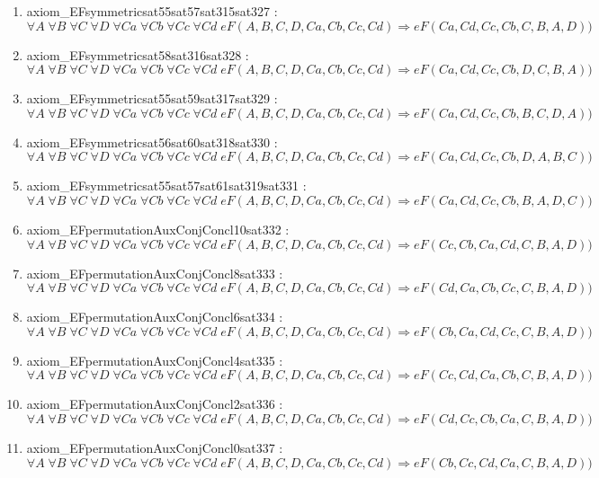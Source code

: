 \documentclass{article}
\begin{document}
\begin{enumerate}
\item axiom\_EFsymmetricsat55sat57sat315sat327 : $\forall A\;\forall B\;\forall C\;\forall D\;\forall Ca\;\forall Cb\;\forall Cc\;\forall Cd\;eF(A, B, C, D, Ca, Cb, Cc, Cd) \Rightarrow eF(Ca, Cd, Cc, Cb, C, B, A, D))$
\item axiom\_EFsymmetricsat58sat316sat328 : $\forall A\;\forall B\;\forall C\;\forall D\;\forall Ca\;\forall Cb\;\forall Cc\;\forall Cd\;eF(A, B, C, D, Ca, Cb, Cc, Cd) \Rightarrow eF(Ca, Cd, Cc, Cb, D, C, B, A))$
\item axiom\_EFsymmetricsat55sat59sat317sat329 : $\forall A\;\forall B\;\forall C\;\forall D\;\forall Ca\;\forall Cb\;\forall Cc\;\forall Cd\;eF(A, B, C, D, Ca, Cb, Cc, Cd) \Rightarrow eF(Ca, Cd, Cc, Cb, B, C, D, A))$
\item axiom\_EFsymmetricsat56sat60sat318sat330 : $\forall A\;\forall B\;\forall C\;\forall D\;\forall Ca\;\forall Cb\;\forall Cc\;\forall Cd\;eF(A, B, C, D, Ca, Cb, Cc, Cd) \Rightarrow eF(Ca, Cd, Cc, Cb, D, A, B, C))$
\item axiom\_EFsymmetricsat55sat57sat61sat319sat331 : $\forall A\;\forall B\;\forall C\;\forall D\;\forall Ca\;\forall Cb\;\forall Cc\;\forall Cd\;eF(A, B, C, D, Ca, Cb, Cc, Cd) \Rightarrow eF(Ca, Cd, Cc, Cb, B, A, D, C))$
\item axiom\_EFpermutationAuxConjConcl10sat332 : $\forall A\;\forall B\;\forall C\;\forall D\;\forall Ca\;\forall Cb\;\forall Cc\;\forall Cd\;eF(A, B, C, D, Ca, Cb, Cc, Cd) \Rightarrow eF(Cc, Cb, Ca, Cd, C, B, A, D))$
\item axiom\_EFpermutationAuxConjConcl8sat333 : $\forall A\;\forall B\;\forall C\;\forall D\;\forall Ca\;\forall Cb\;\forall Cc\;\forall Cd\;eF(A, B, C, D, Ca, Cb, Cc, Cd) \Rightarrow eF(Cd, Ca, Cb, Cc, C, B, A, D))$
\item axiom\_EFpermutationAuxConjConcl6sat334 : $\forall A\;\forall B\;\forall C\;\forall D\;\forall Ca\;\forall Cb\;\forall Cc\;\forall Cd\;eF(A, B, C, D, Ca, Cb, Cc, Cd) \Rightarrow eF(Cb, Ca, Cd, Cc, C, B, A, D))$
\item axiom\_EFpermutationAuxConjConcl4sat335 : $\forall A\;\forall B\;\forall C\;\forall D\;\forall Ca\;\forall Cb\;\forall Cc\;\forall Cd\;eF(A, B, C, D, Ca, Cb, Cc, Cd) \Rightarrow eF(Cc, Cd, Ca, Cb, C, B, A, D))$
\item axiom\_EFpermutationAuxConjConcl2sat336 : $\forall A\;\forall B\;\forall C\;\forall D\;\forall Ca\;\forall Cb\;\forall Cc\;\forall Cd\;eF(A, B, C, D, Ca, Cb, Cc, Cd) \Rightarrow eF(Cd, Cc, Cb, Ca, C, B, A, D))$
\item axiom\_EFpermutationAuxConjConcl0sat337 : $\forall A\;\forall B\;\forall C\;\forall D\;\forall Ca\;\forall Cb\;\forall Cc\;\forall Cd\;eF(A, B, C, D, Ca, Cb, Cc, Cd) \Rightarrow eF(Cb, Cc, Cd, Ca, C, B, A, D))$

\end{enumerate}
\end{document}
